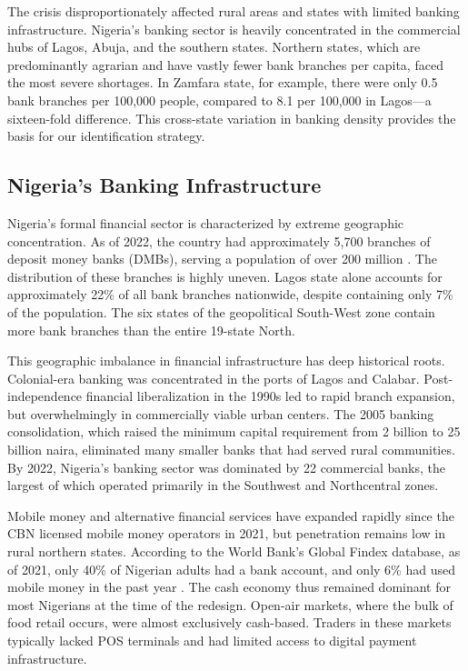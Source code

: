 \documentclass[12pt]{article}
\begin{document}
The crisis disproportionately affected rural areas and states with limited banking infrastructure. Nigeria's banking sector is heavily concentrated in the commercial hubs of Lagos, Abuja, and the southern states. Northern states, which are predominantly agrarian and have vastly fewer bank branches per capita, faced the most severe shortages. In Zamfara state, for example, there were only 0.5 bank branches per 100,000 people, compared to 8.1 per 100,000 in Lagos---a sixteen-fold difference. This cross-state variation in banking density provides the basis for our identification strategy.

\subsection{Nigeria's Banking Infrastructure}

Nigeria's formal financial sector is characterized by extreme geographic concentration. As of 2022, the country had approximately 5,700 branches of deposit money banks (DMBs), serving a population of over 200 million \citep{cbn2023banking}. The distribution of these branches is highly uneven. Lagos state alone accounts for approximately 22\% of all bank branches nationwide, despite containing only 7\% of the population. The six states of the geopolitical South-West zone contain more bank branches than the entire 19-state North.

This geographic imbalance in financial infrastructure has deep historical roots. Colonial-era banking was concentrated in the ports of Lagos and Calabar. Post-independence financial liberalization in the 1990s led to rapid branch expansion, but overwhelmingly in commercially viable urban centers. The 2005 banking consolidation, which raised the minimum capital requirement from 2 billion to 25 billion naira, eliminated many smaller banks that had served rural communities. By 2022, Nigeria's banking sector was dominated by 22 commercial banks, the largest of which operated primarily in the Southwest and Northcentral zones.

Mobile money and alternative financial services have expanded rapidly since the CBN licensed mobile money operators in 2021, but penetration remains low in rural northern states. According to the World Bank's Global Findex database, as of 2021, only 40\% of Nigerian adults had a bank account, and only 6\% had used mobile money in the past year \citep{wbdi2024}. The cash economy thus remained dominant for most Nigerians at the time of the redesign. Open-air markets, where the bulk of food retail occurs, were almost exclusively cash-based. Traders in these markets typically lacked POS terminals and had limited access to digital payment infrastructure.
\end{document}
